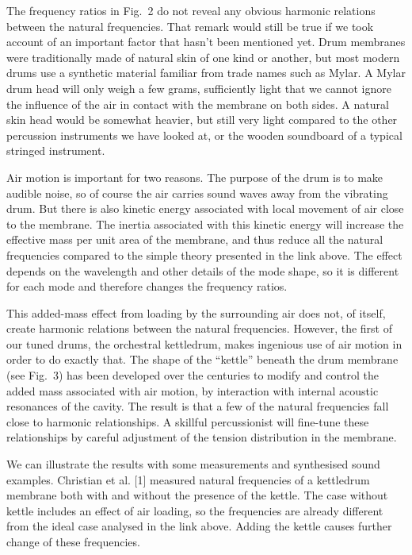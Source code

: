   The frequency ratios in Fig.\ 2 do not reveal any obvious harmonic relations 
  between the natural frequencies. That remark would still be true if we took 
  account of an important factor that hasn't been mentioned yet. Drum membranes 
  were traditionally made of natural skin of one kind or another, but most 
  modern drums use a synthetic material familiar from trade names such as 
  Mylar. A Mylar drum head will only weigh a few grams, sufficiently light that 
  we cannot ignore the influence of the air in contact with the membrane on 
  both sides. A natural skin head would be somewhat heavier, but still very 
  light compared to the other percussion instruments we have looked at, or the 
  wooden soundboard of a typical stringed instrument. 

  Air motion is important for two reasons. The purpose of the drum is to make 
  audible noise, so of course the air carries sound waves away from the 
  vibrating drum. But there is also kinetic energy associated with local 
  movement of air close to the membrane. The inertia associated with this 
  kinetic energy will increase the effective mass per unit area of the 
  membrane, and thus reduce all the natural frequencies compared to the simple 
  theory presented in the link above. The effect depends on the wavelength and 
  other details of the mode shape, so it is different for each mode and 
  therefore changes the frequency ratios. 

  This added-mass effect from loading by the surrounding air does not, of 
  itself, create harmonic relations between the natural frequencies. However, 
  the first of our tuned drums, the orchestral kettledrum, makes ingenious use 
  of air motion in order to do exactly that. The shape of the ``kettle'' 
  beneath the drum membrane (see Fig.\ 3) has been developed over the centuries 
  to modify and control the added mass associated with air motion, by 
  interaction with internal acoustic resonances of the cavity. The result is 
  that a few of the natural frequencies fall close to harmonic relationships. A 
  skillful percussionist will fine-tune these relationships by careful 
  adjustment of the tension distribution in the membrane. 


  We can illustrate the results with some measurements and synthesised sound 
  examples. Christian et al. [1] measured natural frequencies of a kettledrum 
  membrane both with and without the presence of the kettle. The case without 
  kettle includes an effect of air loading, so the frequencies are already 
  different from the ideal case analysed in the link above. Adding the kettle 
  causes further change of these frequencies. 

